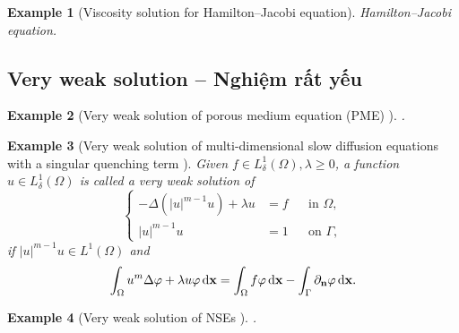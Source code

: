 \documentclass{article}
\newtheorem{example}{Example}
\begin{document}
\begin{example}[Viscosity solution for Hamilton--Jacobi equation]
	Hamilton--Jacobi equation.
\end{example}


\subsection{Very weak solution -- Nghiệm rất yếu}

\begin{example}[Very weak solution of porous medium equation (PME) \cite{Vazquez2007}]
	.
\end{example}

\begin{example}[Very weak solution of multi-dimensional slow diffusion equations with a singular quenching term \cite{Dao_Diaz_Nguyen2020}]
	Given $f\in L_\delta^1(\Omega),\lambda\ge0$, a function $u\in L_\delta^1(\Omega)$ is called a \emph{very weak solution} of
	\begin{equation*}
		\left\{\begin{split}
			-\Delta(|u|^{m-1}u) + \lambda u &= f&&\mbox{in }\Omega,\\
			|u|^{m-1}u &= 1&&\mbox{on }\Gamma,
		\end{split}\right.
	\end{equation*}
	if $|u|^{m-1}u\in L^1(\Omega)$ and
	\begin{equation*}
		\int_\Omega u^m\Delta\varphi + \lambda u\varphi\,{\rm d}{\bf x} = \int_\Omega f\varphi\,{\rm d}{\bf x} - \int_\Gamma \partial_{\bf n}\varphi\,{\rm d}{\bf x}.
	\end{equation*}
\end{example}

\begin{example}[Very weak solution of NSEs \cite{Tsai2018}]
	.
\end{example}
\end{document}
